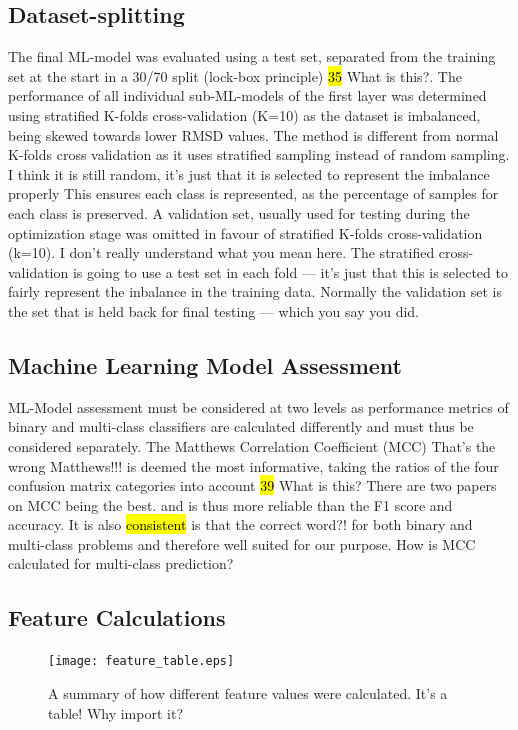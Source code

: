 \documentclass[12pt]{article}
\newcommand{\lilian}[1]{ {\color{red}{\bfseries Lilian:} #1}}
\newcommand{\highlight}[1]{\hl{#1}}
\begin{document}
\subsection{Dataset-splitting}
The final ML-model was evaluated using a test set, separated from the
training set at the start in a 30/70 split (lock-box principle)
\highlight{35}\lilian{What is this?}. The performance of all individual sub-ML-models of the first layer
was determined using stratified K-folds cross-validation (K=10) as the
dataset is imbalanced, being skewed towards lower RMSD values. The
method is different from normal K-folds cross validation as it uses
stratified sampling instead of random sampling.
\lilian{I think it is still random, it's just that it is selected to represent the imbalance properly}
This ensures each
class is represented, as the percentage of samples for each class is
preserved.
A validation set, usually used for testing during the optimization
stage was omitted in favour of stratified K-folds cross-validation
(k=10)\cite{Krstajic2014,Kohavi1995}.
\lilian{I don't really understand what you mean here. The stratified
  cross-validation is going to use a test set in each fold --- it's
  just that this is selected to fairly represent the inbalance in the
  training data. Normally the validation set is the set that is held
  back for final testing --- which you say you did.}

\subsection{Machine Learning Model Assessment} 
ML-Model assessment must be considered at two levels as performance
metrics of binary and multi-class classifiers are calculated
differently and must thus be considered separately. The Matthews
Correlation Coefficient (MCC)\cite{Matthews1975}\lilian{That's the wrong Matthews!!!} is deemed the most
informative, taking the ratios of the four confusion matrix categories
into account \highlight{39}\lilian{What is this? There are two papers on MCC being the best.} and is thus more reliable than the F1 score and
accuracy. It is also \highlight{consistent}\lilian{is that the correct word?!} for both binary and multi-class
problems and therefore well suited for our purpose.\lilian{How is MCC calculated for multi-class prediction?} 
 
\subsection{Feature Calculations}
\begin{figure}
  \centering
  \texttt{[image: feature\_table.eps]}
  \caption {A summary of how different feature values were calculated. \lilian{It's a table! Why import it?}}
  \label{fig:feature_table}
\end{figure}
\end{document}
